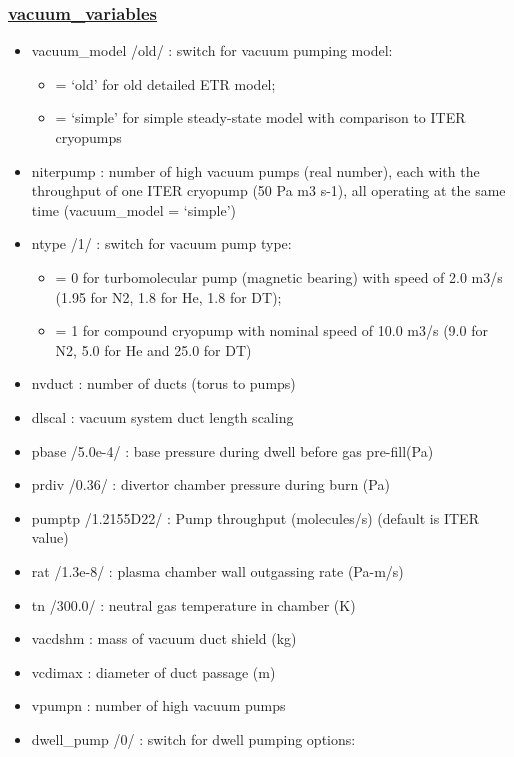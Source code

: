 \documentclass[]{article}
\providecommand{\tightlist}{%
  \setlength{\itemsep}{0pt}\setlength{\parskip}{0pt}}
\begin{document}
\begin{itemize}
  \subsubsection{\texorpdfstring{\href{vacuum_variables.html}{vacuum\_variables}}{vacuum\_variables}}\label{vacuum_variables}

  \begin{itemize}
  \item
    vacuum\_model /old/ : switch for vacuum pumping model:

    \begin{itemize}
    \tightlist
    \item
      = `old' for old detailed ETR model;
    \item
      = `simple' for simple steady-state model with comparison to ITER
      cryopumps
    \end{itemize}
  \item
    niterpump : number of high vacuum pumps (real number), each with the
    throughput of one ITER cryopump (50 Pa m3 s-1), all operating at the
    same time (vacuum\_model = `simple')
  \item
    ntype /1/ : switch for vacuum pump type:

    \begin{itemize}
    \tightlist
    \item
      = 0 for turbomolecular pump (magnetic bearing) with speed of 2.0
      m3/s (1.95 for N2, 1.8 for He, 1.8 for DT);
    \item
      = 1 for compound cryopump with nominal speed of 10.0 m3/s (9.0 for
      N2, 5.0 for He and 25.0 for DT)
    \end{itemize}
  \item
    nvduct : number of ducts (torus to pumps)
  \item
    dlscal : vacuum system duct length scaling
  \item
    pbase /5.0e-4/ : base pressure during dwell before gas pre-fill(Pa)
  \item
    prdiv /0.36/ : divertor chamber pressure during burn (Pa)
  \item
    pumptp /1.2155D22/ : Pump throughput (molecules/s) (default is ITER
    value)
  \item
    rat /1.3e-8/ : plasma chamber wall outgassing rate (Pa-m/s)
  \item
    tn /300.0/ : neutral gas temperature in chamber (K)
  \item
    vacdshm : mass of vacuum duct shield (kg)
  \item
    vcdimax : diameter of duct passage (m)
  \item
    vpumpn : number of high vacuum pumps
  \item
    dwell\_pump /0/ : switch for dwell pumping options:


\end{itemize}
\end{itemize}
\end{document}
